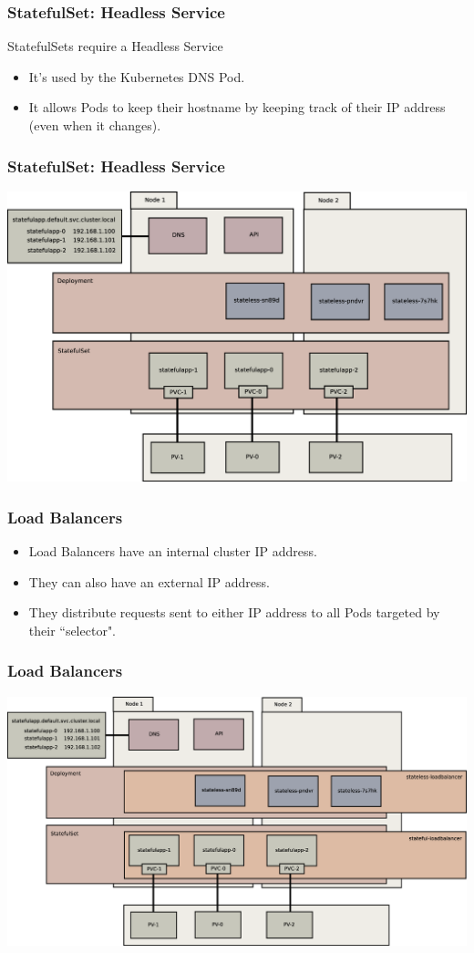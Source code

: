 \documentclass{beamer}
\begin{document}
\begin{frame}
    \frametitle{StatefulSet: Headless Service}
    StatefulSets require a Headless Service
    \begin{itemize}
        \item It's used by the Kubernetes DNS Pod.\pause
        \item It allows Pods to keep their hostname by keeping track of their IP address (even when it changes).
    \end{itemize}
\end{frame}

\begin{frame}
    \frametitle{StatefulSet: Headless Service}
    \includegraphics[width=\textwidth,height=0.85\textheight,keepaspectratio]{graphics/07-persistentIdentity.eps}
\end{frame}

\begin{frame}
    \frametitle{Load Balancers}
    \begin{itemize}
        \item Load Balancers have an internal cluster IP address.\pause
        \item They can also have an external IP address.\pause
        \item They distribute requests sent to either IP address to all Pods targeted by their ``selector".
    \end{itemize}
\end{frame}

\begin{frame}
    \frametitle{Load Balancers}
    \includegraphics[width=\textwidth,height=0.85\textheight,keepaspectratio]{graphics/08-loadBalancer.eps}
\end{frame}
\end{document}
